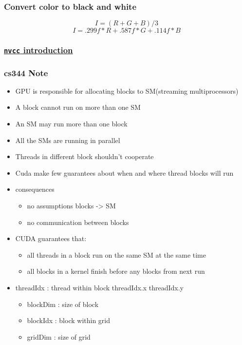 \documentclass[11pt]{article}
\begin{document}
\subsubsection{Convert color to black and white}
\label{sec:orgheadline8}
\[I = (R + G + B) / 3\]
\[I = .299f * R + .587f * G + .114f * B\]
\subsubsection{\href{http://docs.nvidia.com/cuda/cuda-compiler-driver-nvcc/index.html#cuda-programming-model}{ \texttt{nvcc} introduction}}
\label{sec:orgheadline9}
\subsubsection{cs344 Note}
\label{sec:orgheadline10}
\begin{itemize}
\item GPU is responsible for allocating blocks to SM(streaming multiprocessors)
\item A block cannot run on more than one SM
\item An SM may run more than one block
\item All the SMs are running in parallel
\item Threads in different block shouldn't cooperate
\item Cuda make few guarantees about when and where thread blocks will run
\item consequences
\begin{itemize}
\item no assumptions blocks -> SM
\item no communication between blocks
\end{itemize}
\item CUDA guarantees that:
\begin{itemize}
\item all threads in a block run on the same SM at the same time
\item all blocks in a kernel finish before any blocks from next run
\end{itemize}
\item threadIdx : thread within block threadIdx.x threadIdx.y
\begin{itemize}
\item blockDim : size of block
\item blockIdx : block within grid
\item gridDim : size of grid
\end{itemize}
\end{itemize}
\end{document}
